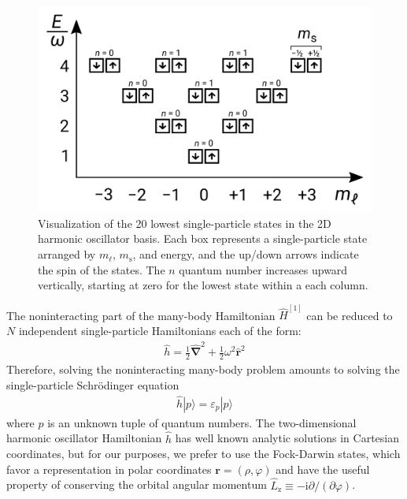 \begin{figure}
  \includegraphics[width=\textwidth]{figures/fig-shell-structure-v2}
  \caption{Visualization of the 20 lowest single-particle states in the 2D harmonic oscillator basis.  Each box represents a single-particle state arranged by $m_\ell$, $m_{\mathrm{s}}$, and energy, and the up/down arrows indicate the spin of the states.  The $n$ quantum number increases upward vertically, starting at zero for the lowest state within a each column.}
  \label{fig:shell-structure}
\end{figure}

The noninteracting part of the many-body Hamiltonian $\hat{H}^{[1]}$ can be reduced to $N$ independent single-particle Hamiltonians each of the form:
\begin{align*}
  \hat{h} = \frac{1}{2} \hat{\bm{\nabla}}^2 + \frac{1}{2} \omega^2 \hat{\bm{r}}^2
\end{align*}
Therefore, solving the noninteracting many-body problem amounts to solving the single-particle Schr\"odinger equation
\begin{align*}
  \hat{h} |p\rangle = \varepsilon_p |p\rangle
\end{align*}
where $p$ is an unknown tuple of quantum numbers.  The two-dimensional harmonic oscillator Hamiltonian $\hat{h}$ has well known analytic solutions in Cartesian coordinates, but for our purposes, we prefer to use the Fock-Darwin states, which favor a representation in polar coordinates $\bm{r} = (\rho, \varphi)$ and have the useful property of conserving the orbital angular momentum $\hat{L}_{\mathrm{z}} \equiv -\mathrm{i} \partial / (\partial \varphi)$.

